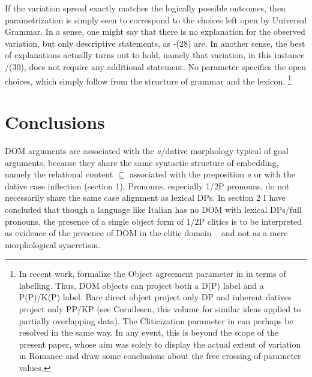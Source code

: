 \documentclass[output=paper,nonflat,modfonts]{langsci/langscibook}
\begin{document}
If the variation spread exactly matches the logically possible outcomes, then parametrization is simply seen to correspond to the choices left open by Universal Grammar. In a sense, one might say that there is no explanation for the observed variation, but only descriptive statements, as -(28) are. In another sense, the best of explanations actually turns out to hold, namely that variation, in this instance /(30), does not require any additional statement. No parameter specifies the open choices, which simply follow from the structure of grammar and the lexicon.\textstyleFootnoteSymbol{} \footnote{In recent work, \citet{ManziniFranco2019} formalize the Object agreement parameter in  in terms of labelling. Thus, DOM objects can project both a D(P) label and a P(P)/K(P) label. Bare direct object project only DP and inherent datives project only PP/KP (see Cornilescu, this volume for similar ideas applied to partially overlapping data). The Cliticization parameter in  can perhaps be resolved in the same way. In any event, this is beyond the scope of the present paper, whose aim was solely to display the actual extent of variation in Romance and draw some conclusions about the free crossing of parameter values.} 

\section{ Conclusions} %

DOM arguments are associated with the \textit{a}/dative morphology typical of goal arguments, because they share the same syntactic structure of embedding, namely the relational content ${\subseteq}$ associated with the preposition \textit{a} or with the dative case inflection (section 1). Pronouns, especially 1/2P pronouns, do not necessarily share the same case alignment as lexical DPs. In section 2 I have concluded that though a language like Italian has no DOM with lexical DPs/full pronouns, the presence of a single object form of 1/2P clitics is to be interpreted as evidence of the presence of DOM in the clitic domain – and not as a mere morphological syncretism.
\end{document}
